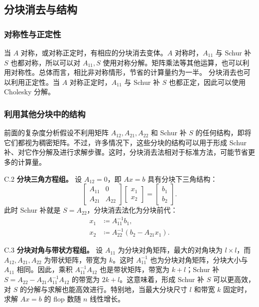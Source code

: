 \subsection{分块消去与结构}
\subsubsection*{对称性与正定性}
当 $A$ 对称，或对称正定时，有相应的分块消去变体。$A$ 对称时，$A_{11}$ 与 Schur 补 $S$ 也都对称，所以可以对 $A_{11},S$ 使用对称分解。矩阵乘法等其他运算，也可以利用对称性。总体而言，相比非对称情形，节省的计算量约为一半。
分块消去也可以利用正定性。当 $A$ 对称正定时，$A_{11}$ 与 Schur 补 $S$ 也都正定，因此可以使用 Cholesky 分解。

\subsubsection*{利用其他分块中的结构}
前面的复杂度分析假设不利用矩阵 $A_{12},A_{21},A_{22}$ 和 Schur 补 $S$ 的任何结构，即将它们都视为稠密矩阵。不过，许多情况下，这些分块的结构可以用于形成 Schur 补、对它作分解及进行求解步骤。这时，分块消去法相对于标准方法，可能节省更多的计算量。

\begin{origexample}{C.2}
\textbf{分块三角方程组。} 设 $A_{12}=0$，即 $Ax=b$ 具有分块下三角结构：
\[
 \begin{bmatrix}A_{11}&0\\A_{21}&A_{22}\end{bmatrix}
 \begin{bmatrix}x_1\\x_2\end{bmatrix}=\begin{bmatrix}b_1\\b_2\end{bmatrix}.
\]
此时 Schur 补就是 $S=A_{22}$，分块消去法化为分块前代：
\begin{align*}
 x_1&\coloneqq A_{11}^{-1}b_1,\\
 x_2&\coloneqq A_{22}^{-1}(b_2-A_{21}x_1).
\end{align*}
\end{origexample}

\begin{origexample}{C.3}
\textbf{分块对角与带状方程组。} 设 $A_{11}$ 为分块对角矩阵，最大的对角块为 $l\times l$，而 $A_{12},A_{21},A_{22}$ 为带状矩阵，带宽为 $k$。这时 $A_{11}^{-1}$ 也为分块对角矩阵，分块大小与 $A_{11}$ 相同。因此，乘积 $A_{11}^{-1}A_{12}$ 也是带状矩阵，带宽为 $k+l$；Schur 补 $S=A_{22}-A_{21}A_{11}^{-1}A_{12}$ 的带宽为 $2k+l$。这意味着，形成 Schur 补 $S$ 可以更高效，对 $S$ 的分解与求解也能高效进行。特别地，当最大分块尺寸 $l$ 和带宽 $k$ 固定时，求解 $Ax=b$ 的 flop 数随 $n$ 线性增长。
\end{origexample}

